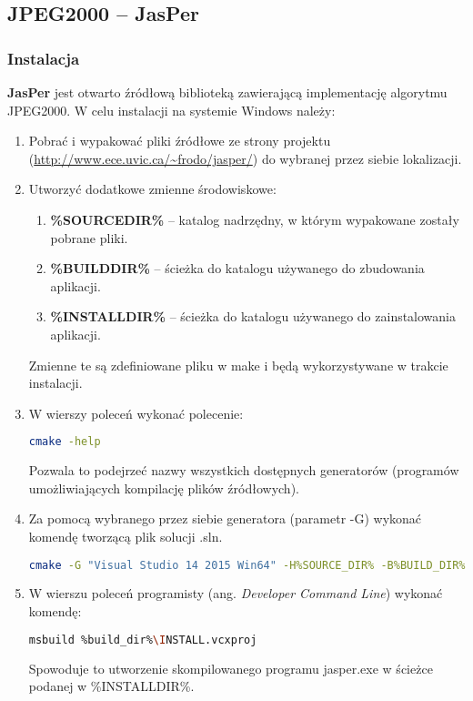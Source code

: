 \subsection{JPEG2000 -- JasPer}

\subsubsection{Instalacja}

\textbf{JasPer} jest otwarto źródłową biblioteką zawierającą implementację algorytmu JPEG2000. W celu instalacji na systemie Windows należy:

\begin{enumerate}
	\item Pobrać i wypakować pliki źródłowe ze strony projektu (\url{http://www.ece.uvic.ca/~frodo/jasper/}) do wybranej przez siebie lokalizacji.
	
	\item Utworzyć dodatkowe zmienne środowiskowe:
	\begin{enumerate}
		\item \textbf{\%SOURCE\textunderscore DIR\%} -- katalog nadrzędny, w którym wypakowane zostały pobrane pliki.
		\item \textbf{\%BUILD\textunderscore DIR\%} -- ścieżka do katalogu używanego do zbudowania aplikacji.
		\item \textbf{\%INSTALL\textunderscore DIR\%} -- ścieżka do katalogu używanego do zainstalowania aplikacji.
	\end{enumerate}
	Zmienne te są zdefiniowane pliku w make i będą wykorzystywane w trakcie instalacji.
	
	\item W wierszy poleceń wykonać polecenie:
	
	\begin{lstlisting}[language=bash]
	cmake -help
	\end{lstlisting}
	
	Pozwala to podejrzeć nazwy wszystkich dostępnych generatorów (programów umożliwiających kompilację plików źródłowych).
	
	\item Za pomocą wybranego przez siebie generatora (parametr -G) wykonać komendę tworzącą plik solucji .sln.
	
	\begin{lstlisting}[language=bash]
	cmake -G "Visual Studio 14 2015 Win64" -H%SOURCE_DIR% -B%BUILD_DIR% ^ -DCMAKE_INSTALL_PREFIX=%INSTALL_DIR%
	\end{lstlisting}
	
	\item W wierszu poleceń programisty (ang. \textit{Developer Command Line}) wykonać komendę:
	
	\begin{lstlisting}[language=bash]
	msbuild %build_dir%\INSTALL.vcxproj
	\end{lstlisting}
	
	Spowoduje to utworzenie skompilowanego programu jasper.exe w ścieżce podanej w \%INSTALL\textunderscore DIR\%.
\end{enumerate}



